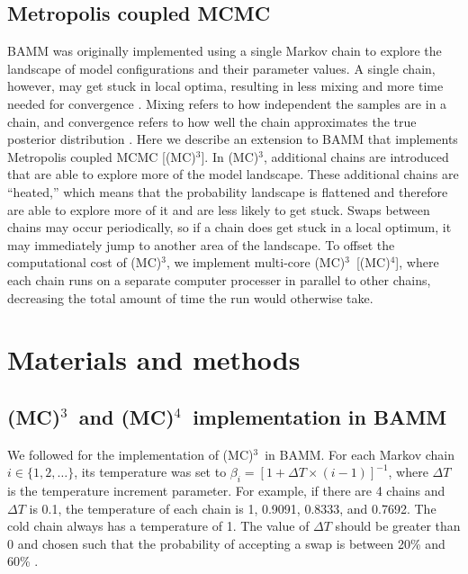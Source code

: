 \documentclass[12pt]{article}
\newcommand{\MCMCMC}{(MC)$^{3}$}
\newcommand{\MCMCMCMC}{(MC)$^{4}$}
\begin{document}
\subsection*{Metropolis coupled MCMC}

BAMM was originally implemented using a single Markov chain
to explore the landscape of model configurations and their parameter values.
%
A single chain, however, may get stuck in local optima,
resulting in less mixing and more time needed for convergence \citep{alt04}.
%
Mixing refers to how independent the samples are in a chain,
and convergence refers to how well the chain
approximates the true posterior distribution \citep{giv05}.
%
Here we describe an extension to BAMM
that implements Metropolis coupled MCMC [\MCMCMC].
%
In \MCMCMC, additional chains are introduced
that are able to explore more of the model landscape.
%
These additional chains are ``heated,''
which means that the probability landscape is flattened
and therefore are able to explore more of it
and are less likely to get stuck.
%
Swaps between chains may occur periodically,
so if a chain does get stuck in a local optimum,
it may immediately jump to another area of the landscape.
%
To offset the computational cost of \MCMCMC, we implement
multi-core \MCMCMC\ [\MCMCMCMC], where each chain
runs on a separate computer processer in parallel to other chains,
decreasing the total amount of time the run would otherwise take.


\section*{Materials and methods}

\subsection*{\MCMCMC\ and \MCMCMCMC\ implementation in BAMM}

We followed \citet{alt04} for the implementation of \MCMCMC\ in BAMM.
%
For each Markov chain $i \in \{1, 2, \dots\}$, its temperature was set to
$\beta_i = [1 + \Delta T \times (i - 1)]^{-1}$,
where $\Delta T$ is the temperature increment parameter.
%
For example, if there are 4 chains and $\Delta T$ is 0.1,
the temperature of each chain is 1, 0.9091, 0.8333, and 0.7692.
%
The cold chain always has a temperature of 1.
%
The value of $\Delta T$ should be greater than 0
and chosen such that the probability of accepting a swap
is between 20\% and 60\% \citep{alt04}.
\end{document}
